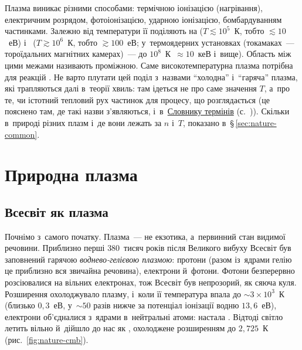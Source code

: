 Плазма виникає різними способами: термічною іонізацією (нагрівання), електричним розрядом,
фотоіонізацією, ударною іонізацією, бомбардуванням частинками. Залежно від температури її
поділяють на  ($T\lesssim10^5$~К, тобто $\lesssim10$~еВ) і~
($T\gtrsim10^6$~К, тобто $\gtrsim100$~еВ; у~термоядерних установках (токамаках~--- тороїдальних магнітних камерах)~--- до $10^8$~К~$\approx10$~кеВ і~вище). Область між цими межами називають проміжною. Саме високотемпературна плазма потрібна для реакцій
. Не варто плутати цей поділ з~назвами \enquote{холодна}
і~\enquote{гаряча} плазма, які трапляються далі в~теорії хвиль: там ідеться не про саме значення $T$,
а~про те, чи істотний тепловий рух частинок для процесу, що розглядається (це пояснено там, де такі
назви з'являються, і~в~\hyperref[sec:glossary]{Словнику термінів} (с.~\pageref{sec:glossary})).
Скільки в~природі різних плазм і~де вони лежать за $n$ і~$T$, показано в~§\,\ref{sec:nature-common}.

\section{Природна плазма}\label{sec:nature-natural}

\subsection*{Всесвіт як плазма}

Почнімо з~самого початку. Плазма~--- не екзотика, а~первинний стан видимої речовини. Приблизно перші 380~тисяч років після Великого вибуху
Всесвіт був заповнений гарячою \emph{воднево-гелієвою плазмою}: протони (разом із~ядрами гелію це приблизно вся звичайна речовина), електрони й~фотони.
Фотони безперервно розсіювалися на вільних електронах, тож Всесвіт був непрозорий, як сяюча куля. Розширення охолоджувало плазму, і~коли її температура впала
до $\sim3\times10^{3}$~К (близько $0{,}3$~еВ, у~$\sim50$ разів нижче за потенціал іонізації водню $13{,}6$~еВ), електрони об'єдналися з~ядрами в~нейтральні атоми:
настала . Відтоді світло летить вільно й~дійшло до нас як
, охолоджене розширенням до $2{,}725$~К (рис.~\ref{fig:nature-cmb}).

